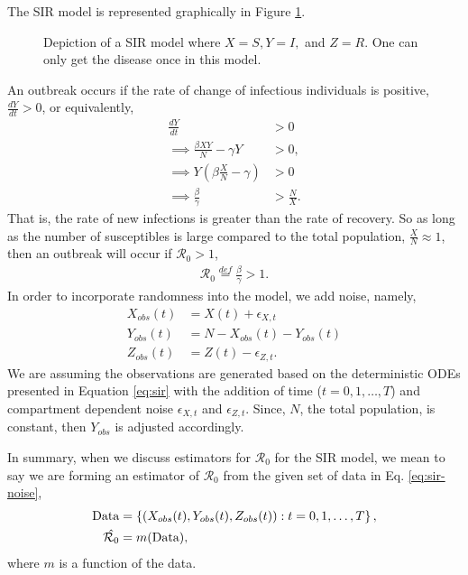 \message{ !name(draft_v13.tex)}\documentclass[12pt]{article}
\newcommand{\rr}{\ensuremath{\mathcal{R}_0}}
\begin{document}
The SIR model is represented graphically in Figure \ref{fig::sir}. 
\begin{figure}[h]
\centering
{}
\caption{Depiction of a SIR model where $X=S, Y=I,$ and $Z=R$.  One can only get the disease once in this model.}\label{fig::sir}
\end{figure}
An outbreak occurs if the rate of change of infectious individuals is positive, $\frac{dY}{dt} > 0$, or equivalently,
\begin{align*}
  \frac{dY}{dt} &> 0 \\
  \implies \frac{\beta X Y}{N}  - \gamma Y &> 0 ,\\
\implies  Y \left ( \beta \frac{X}{N} - \gamma \right ) & > 0\\
\implies   \frac{\beta}{\gamma} &> \frac{N}{X}.
\end{align*}
That is,  the rate of new infections is greater than the rate of recovery.  So as long as the number of susceptibles is large compared to the total population, $\frac{X}{N} \approx 1$, then an outbreak will occur if $\rr >1$,
\begin{align*}
  \rr \overset{def}{=} \frac{\beta}{\gamma} > 1.
  \end{align*}
  In order to incorporate randomness into the model, we add noise, namely,
  \begin{align}\label{eq:sir-noise}
    X_{obs}(t) &= X(t) + \epsilon_{X,t}\\
    Y_{obs}(t) &=  N - X_{obs}(t) -Y_{obs}(t)  \nonumber\\
    Z_{obs}(t) &= Z(t) - \epsilon_{Z,t}. \nonumber
  \end{align}
We are assuming the observations are generated based on the deterministic ODEs presented in Equation \ref{eq:sir} with the addition of time ($t=0, 1, \dots, T$) and compartment dependent noise $\epsilon_{X,t}$ and $\epsilon_{Z,t}$.  Since, $N$, the total population, is constant, then $Y_{obs}$ is adjusted accordingly.

In summary, when we discuss estimators for $\rr$ for the SIR model, we mean to say we are forming an estimator of $\rr$ from the given set of data in Eq. \ref{eq:sir-noise},
\begin{align*}
  \textnormal{Data} &= \left \{\left (X_{obs}(t), Y_{obs}(t), Z_{obs}(t) \right ) : t=0, 1, \dots, T\right \}, \\
  \hat{\rr} &= m(\textnormal{Data}),
\end{align*}
where $m$ is a function of the data.
\end{document}
